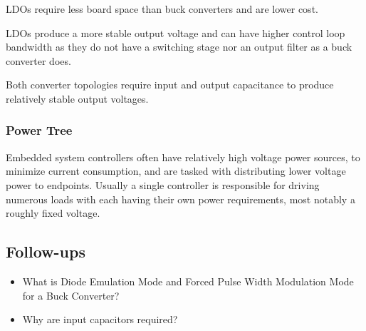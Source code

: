 \documentclass[main.tex]{subfiles}
\begin{document}
LDOs require less board space than buck converters and are lower cost. 

LDOs produce a more stable output voltage and can have higher control loop bandwidth as they do not have a switching stage nor an output filter as a buck converter does. 

Both converter topologies require input and output capacitance to produce relatively stable output voltages.

\subsubsection{Power Tree}
Embedded system controllers often have relatively high voltage power sources, to minimize current consumption, and are tasked with distributing lower voltage power to endpoints. Usually a single controller is responsible for driving numerous loads with each having their own power requirements, most notably a roughly fixed voltage. 

\subsection{Follow-ups}
\begin{itemize}
    \item What is Diode Emulation Mode and Forced Pulse Width Modulation Mode for a Buck Converter?
    \item Why are input capacitors required?
\end{itemize}
\end{document}
